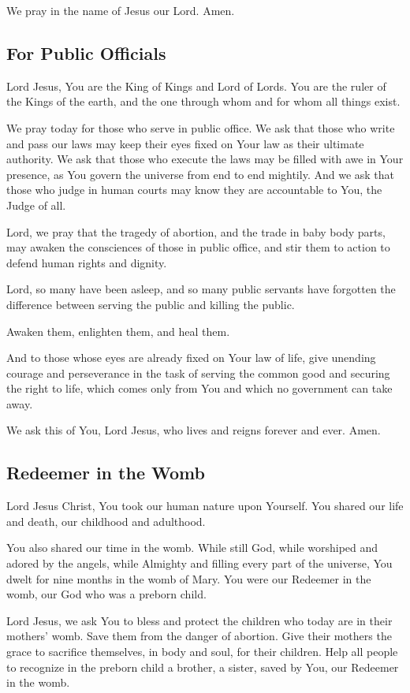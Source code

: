 \documentclass[12pt]{article}
\newcommand{\prayertitle}[1]{\subsection{#1}}
\begin{document}
We pray in the name of Jesus our Lord. Amen.

\prayertitle{For Public Officials}
Lord Jesus,
You are the King of Kings and Lord of Lords.
You are the ruler of the Kings of the earth, and the one through whom and for whom all things exist.

We pray today for those who serve in public office.
We ask that those who write and pass our laws may keep their eyes fixed on Your law as their ultimate authority.
We ask that those who execute the laws may be filled with awe in Your presence, as You govern the universe from end to end mightily.
And we ask that those who judge in human courts may know they are accountable to You, the Judge of all.

Lord, we pray that the tragedy of abortion, and the trade in baby body parts, may awaken the consciences of those in public office, and stir them to action to defend human rights and dignity.

Lord, so many have been asleep, and so many public servants have forgotten the difference between serving the public and killing the public.

Awaken them, enlighten them, and heal them.

And to those whose eyes are already fixed on Your law of life, give unending courage and perseverance in the task of serving the common good and securing the right to life, which comes only from You and which no government can take away.

We ask this of You, Lord Jesus, who lives and reigns forever and ever. Amen.

\prayertitle{Redeemer in the Womb}
Lord Jesus Christ, You took our human nature upon Yourself.
You shared our life and death, our childhood and adulthood.

You also shared our time in the womb. While still God, while worshiped and adored by the angels, while Almighty and filling every part of the universe, You dwelt for nine months in the womb of Mary.
You were our Redeemer in the womb, our God who was a preborn child.

Lord Jesus, we ask You to bless and protect the children who today are in their mothers' womb.
Save them from the danger of abortion.
Give their mothers the grace to sacrifice themselves, in body and soul, for their children.
Help all people to recognize in the preborn child a brother, a sister, saved by You, our Redeemer in the womb.
\end{document}
